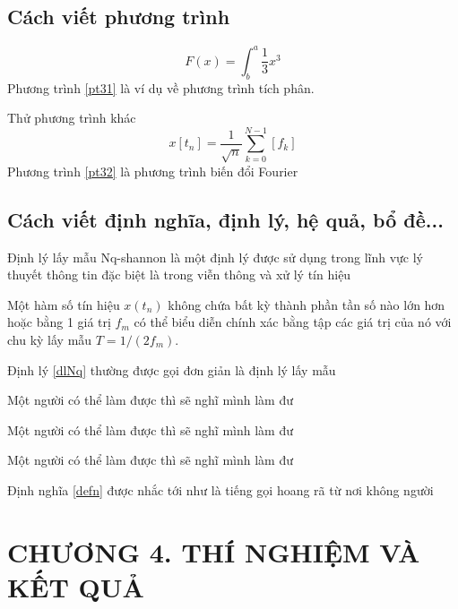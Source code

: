 \subsection{Cách viết phương trình}
\begin{equation}
    \label{pt31}
    F(x) = \int^a_b \frac{1}{3}x^3
\end{equation}
Phương trình \ref{pt31} là ví dụ về phương trình tích phân.

Thử phương trình khác 
\begin{equation}
    \label{pt32}
    x[t_n] = \frac{1}{\sqrt{n}} \sum_{k=0}^{N-1}[f_k]
\end{equation}
Phương trình \ref{pt32} là phương trình biến đổi Fourier
\subsection{Cách viết định nghĩa, định lý, hệ quả, bổ đề...}
Định lý lấy mẫu Nq-shannon là một định lý được sử dụng trong lĩnh vực lý thuyết thông tin đặc biệt là trong viễn thông và xử lý tín hiệu 
\begin{theorem} %
    \label{dlNq}
    Một hàm số tín hiệu  $x(t_n)$ không chứa bất kỳ thành phần tần số nào lớn hơn hoặc bằng 1 giá trị $f_m$ có thể biểu diễn chính xác bằng tập các giá trị của nó với chu kỳ lấy mẫu $T = 1/(2f_m)$.
\end{theorem}
Định lý \ref{dlNq} thường được gọi đơn giản là định lý lấy mẫu 
\begin{corollary}
    Một người có thể làm được thì sẽ nghĩ mình làm đư
\end{corollary}
\begin{lemma}
    Một người có thể làm được thì sẽ nghĩ mình làm đư
\end{lemma}
\begin{defn}
    \label{defn}
    Một người có thể làm được thì sẽ nghĩ mình làm đư
\end{defn}
Định nghĩa \ref{defn} được nhắc tới như là tiếng gọi hoang rã từ nơi không người
\cleardoublepage

\section*{\centering CHƯƠNG 4. THÍ NGHIỆM VÀ KẾT QUẢ}
\setcounter{section}{4}
\setcounter{subsection}{0}
\setcounter{figure}{0}
\setcounter{table}{0}
